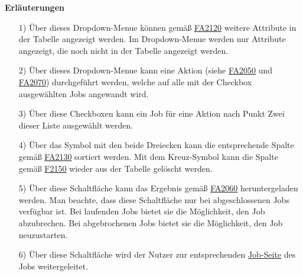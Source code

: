 \textbf{Erläuterungen}
\begin{itemize}
    \item[1)] Über dieses \gls{Dropdown-Menue} können gemäß \hyperref[FA:Web-Interface:Hinzufügen von Spalten]{FA2120} weitere Attribute in der Tabelle angezeigt werden. Im \gls{Dropdown-Menue} werden nur Attribute angezeigt, die noch nicht in der Tabelle angezeigt werden.
    \item[2)] Über dieses \gls{Dropdown-Menue} kann eine Aktion (siehe \hyperref[FA:Web-Interface:Abbruch mehrerer Jobs auf einmal]{FA2050} und \hyperref[FA:Web-Interface:herunterladen mehrerer Ergebnisse auf einmal]{FA2070}) durchgeführt werden, welche auf alle mit der Checkbox ausgewählten Jobs angewandt wird.
    \item[3)] Über diese Checkboxen kann ein Job für eine Aktion nach Punkt Zwei dieser Liste ausgewählt werden.
    \item[4)] Über das Symbol mit den beide Dreiecken kann die entsprechende Spalte gemäß \hyperref[FA:Web-Interface:Sortieren der Tabelle]{FA2130} sortiert werden. Mit dem Kreuz-Symbol kann die Spalte gemäß \hyperref[FA:Web-Interface:Entfernen von Spalten]{F2150} wieder aus der Tabelle gelöscht werden.
    \item[5)] Über diese Schaltfläche kann das Ergebnis gemäß \hyperref[FA:Web-Interface:Herunterladen eines einzelnen Ergebnisses]{FA2060} heruntergeladen werden. Man beachte, dass diese Schaltfläche nur bei abgeschlossenen Jobs verfügbar ist. Bei laufenden Jobs bietet sie die Möglichkeit, den Job abzubrechen. Bei abgebrochenen Jobs bietet sie die Möglichkeit, den Job neuzustarten.
    \item[6)] Über diese Schaltfläche wird der Nutzer zur entsprechenden \hyperref[pages:job-page]{Job-Seite} des Jobs weitergeleitet.
\end{itemize}

\newpage
